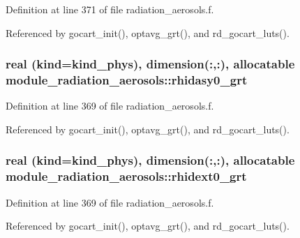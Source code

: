 Definition at line 371 of file radiation\+\_\+aerosols.\+f.



Referenced by gocart\+\_\+init(), optavg\+\_\+grt(), and rd\+\_\+gocart\+\_\+luts().

\subsubsection[{\texorpdfstring{rhidasy0\+\_\+grt}{rhidasy0_grt}}]{\setlength{\rightskip}{0pt plus 5cm}real (kind=kind\+\_\+phys), dimension(\+:,\+:), allocatable module\+\_\+radiation\+\_\+aerosols\+::rhidasy0\+\_\+grt\hspace{0.3cm}{\ttfamily [private]}}\hypertarget{namespacemodule__radiation__aerosols_a8491a714c86e9bd7ebdc401662f5068e}{}\label{namespacemodule__radiation__aerosols_a8491a714c86e9bd7ebdc401662f5068e}


Definition at line 369 of file radiation\+\_\+aerosols.\+f.



Referenced by gocart\+\_\+init(), optavg\+\_\+grt(), and rd\+\_\+gocart\+\_\+luts().

\subsubsection[{\texorpdfstring{rhidext0\+\_\+grt}{rhidext0_grt}}]{\setlength{\rightskip}{0pt plus 5cm}real (kind=kind\+\_\+phys), dimension(\+:,\+:), allocatable module\+\_\+radiation\+\_\+aerosols\+::rhidext0\+\_\+grt\hspace{0.3cm}{\ttfamily [private]}}\hypertarget{namespacemodule__radiation__aerosols_a6683021bded82850053c16eb3e906998}{}\label{namespacemodule__radiation__aerosols_a6683021bded82850053c16eb3e906998}


Definition at line 369 of file radiation\+\_\+aerosols.\+f.



Referenced by gocart\+\_\+init(), optavg\+\_\+grt(), and rd\+\_\+gocart\+\_\+luts().

